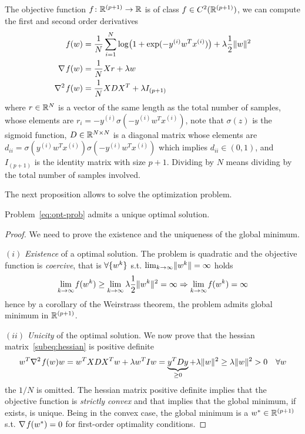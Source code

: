 The objective function $f\colon\mathbb{R}^{(p+1)}\to\mathbb{R}$ is of class $f\in C^2(\mathbb{R}^{(p+1)})$, we can compute the first and second order derivatives
\begin{subequations}\label{eq:f-df-ddf}
\begin{align}
\operatorname*{\mathit{f}}(w) &= \frac{1}{N}\sum_{i=1}^N\log\bigl(1+\exp(-y^{(i)}w^Tx^{(i)})\bigr)+\lambda\frac{1}{2}\lVert w\rVert^2 \label{subeq:obj-fun} \\
\nabla\operatorname*{\mathit{f}}(w) &= \frac{1}{N}Xr+\lambda w \label{subeq:jacobian} \\
\nabla^2\operatorname*{\mathit{f}}(w) &= \frac{1}{N}XDX^T+\lambda I_{(p+1)}\label{subeq:hessian}
\end{align}
\end{subequations}
where $r\in\mathbb{R}^N$ is a vector of the same length as the total number of samples, whose elements are $r_i=-y^{(i)}\sigma(-y^{(i)}w^Tx^{(i)})$, note that $\sigma(z)$ is the sigmoid function, $D\in\mathbb{R}^{N\times N}$ is a diagonal matrix whose elements are $d_{ii}=\sigma(y^{(i)}w^Tx^{(i)})\sigma(-y^{(i)}w^Tx^{(i)})$ which implies $d_{ii}\in(0,1)$, and $I_{(p+1)}$ is the identity matrix with size $p+1$. Dividing by $N$ means dividing by the total number of samples involved.

The next proposition allows to solve the optimization problem.

\begin{prop}
Problem~\eqref{eq:opt-prob} admits a unique optimal solution.
\end{prop}
\begin{proof}
We need to prove the existence and the uniqueness of the global minimum.

\noindent$(i)$ \emph{Existence} of a optimal solution. The problem is quadratic and the objective function is \emph{coercive}, that is $\forall\{w^k\}$ s.t. $\lim_{k\to\infty}\lVert w^k\rVert=\infty$ holds
\[
\lim_{k\to\infty}\operatorname*{\mathit{f}}(w^k)\geq\lim_{k\to\infty}\lambda\frac{1}{2}\lVert w^k\rVert^2=\infty\Rightarrow\lim_{k\to\infty}\operatorname*{\mathit{f}}(w^k)=\infty
\]
hence by a corollary of the Weirstrass theorem, the problem admits global minimum in $\mathbb{R}^{(p+1)}$.

\noindent$(ii)$ \emph{Unicity} of the optimal solution. We now prove that the hessian matrix~\eqref{subeq:hessian} is positive definite
\[
w^T\nabla^2\operatorname*{\mathit{f}}(w)w=w^TXDX^Tw+\lambda w^TIw=\underbrace{y^TDy}_{\geq0}+\lambda\lVert w\rVert^2\geq\lambda\lVert w\rVert^2>0\quad\forall w
\]
the $1/N$ is omitted. The hessian matrix positive definite implies that the objective function is \emph{strictly convex} and that implies that the global minimum, if exists, is unique. Being in the convex case, the global minimum is a $w^\ast\in\mathbb{R}^{(p+1)}$ s.t. $\nabla\operatorname*{\mathit{f}}(w^\ast)=0$ for first-order optimality conditions.\qedhere
\end{proof}

